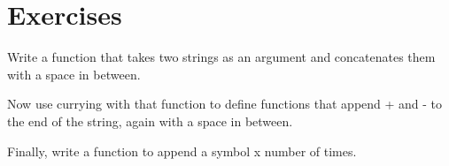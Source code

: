 \documentclass[10pt]{book}
\begin{document}
\section{Exercises}

% 
% 
% 
% 
% 
% 
\begin{ex}
Write a function that takes two strings as an argument and concatenates
them with a space in between.

Now use currying with that function to define functions that append + and - 
to the end of the string, again with a space in between.

Finally, write a function to append a symbol x number of times.

\end{ex}

% 
% 
% 
% 
% 
% 
% 
\end{document}

